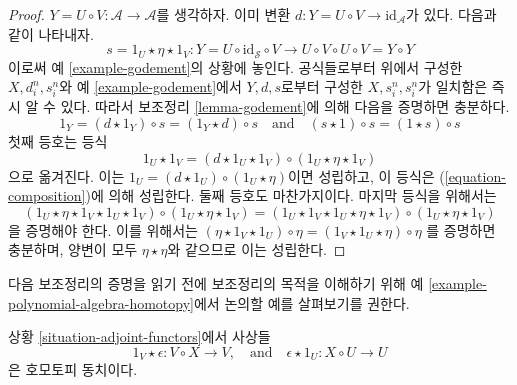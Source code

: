 \begin{proof}
$Y = U \circ V : \mathcal{A} \to \mathcal{A}$를 생각하자. 이미 변환
$d : Y = U \circ V \to \text{id}_\mathcal{A}$가 있다. 다음과 같이
나타내자.
$$
s = 1_U \star \eta \star 1_V :
Y = U \circ \text{id}_\mathcal{S} \circ V
\longrightarrow
U \circ V \circ U \circ V = Y \circ Y
$$
이로써 예 \ref{example-godement}의 상황에 놓인다. 공식들로부터 위에서
구성한 $X, d^n_i, s^n_i$와 예 \ref{example-godement}에서 $Y, d, s$로부터
구성한 $X, s^n_i, s^n_i$가 일치함은 즉시 알 수 있다.
따라서 보조정리 \ref{lemma-godement}에 의해 다음을 증명하면 충분하다.
$$
1_Y = (d \star 1_Y) \circ s = (1_Y \star d) \circ s
\quad\text{and}\quad
(s \star 1) \circ s = (1 \star s) \circ s
$$
첫째 등호는 등식
$$
1_U \star 1_V = (d \star 1_U \star 1_V) \circ (1_U \star \eta \star 1_V)
$$
으로 옮겨진다. 이는
$1_U = (d \star 1_U) \circ (1_U \star \eta)$이면 성립하고, 이 등식은
(\ref{equation-composition})에 의해 성립한다. 둘째 등호도 마찬가지이다.
마지막 등식을 위해서는
$$
(1_U \star \eta \star 1_V \star 1_U \star 1_V) \circ
(1_U \star \eta \star 1_V) =
(1_U \star 1_V \star 1_U \star \eta \star 1_V) \circ
(1_U \star \eta \star 1_V)
$$
을 증명해야 한다. 이를 위해서는
$(\eta \star 1_V \star 1_U) \circ \eta = (1_V \star 1_U \star \eta) \circ \eta$
를 증명하면 충분하며, 양변이 모두 $\eta \star \eta$와 같으므로 이는
성립한다.
\end{proof}

\noindent
다음 보조정리의 증명을 읽기 전에 보조정리의 목적을 이해하기 위해
예 \ref{example-polynomial-algebra-homotopy}에서 논의할 예를 살펴보기를
권한다.

\begin{lemma}
\label{lemma-standard-simplicial-homotopy}
상황 \ref{situation-adjoint-functors}에서 사상들
$$
1_V \star \epsilon : V \circ X \to V,
\quad\text{and}\quad
\epsilon \star 1_U : X \circ U \to U
$$
은 호모토피 동치이다.
\end{lemma}

